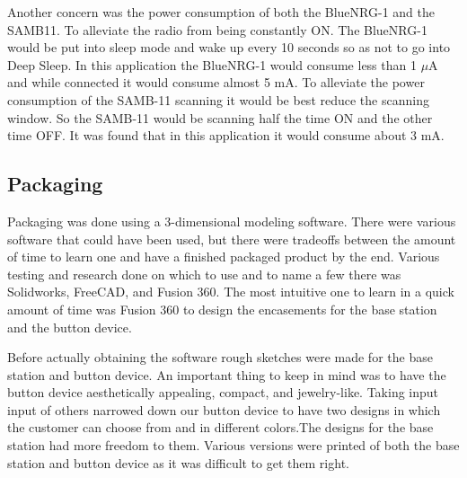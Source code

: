 \documentclass[journal,compsoc]{IEEEtran}
\begin{document}
Another concern was the power consumption of both the BlueNRG-1 and the SAMB11. To alleviate the radio from being constantly ON. The BlueNRG-1 would be put into sleep mode and wake up every 10 seconds so as not to go into Deep Sleep. In this application the BlueNRG-1 would consume less than 1 $\mu$A and while connected it would consume almost 5 mA. To alleviate the power consumption of the SAMB-11 scanning it would be best reduce the scanning window. So the SAMB-11 would be scanning half the time ON and the other time OFF. It was found that in this application it would consume about 3 mA.
\subsection{Packaging}
Packaging was done using a 3-dimensional modeling software. There were various software that could have been used, but there were tradeoffs between the amount of time to learn one and have a finished packaged product by the end. Various testing and research done on which to use and to name a few there was Solidworks, FreeCAD, and Fusion 360. The most intuitive one to learn in a quick amount of time was Fusion 360 to design the encasements for the base station and the button device. 

Before actually obtaining the software rough sketches were made for the base station and button device. An important thing to keep in mind was to have the button device aesthetically appealing, compact, and jewelry-like. Taking input input of others narrowed down our button device to have two designs in which the customer can choose from and in different colors.The designs for the base station had more freedom to them. Various versions were printed of both the base station and button device as it was difficult to get them right.

%
%
\end{document}
